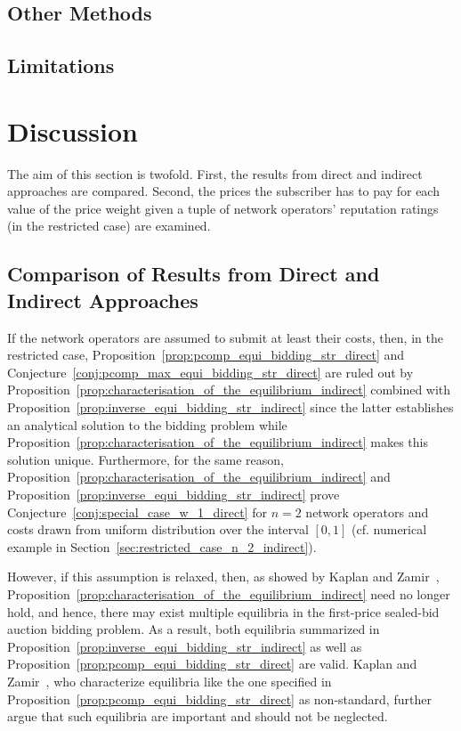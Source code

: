 \subsection{Other Methods} %
\label{sub:other_methods_indirect}


\subsection{Limitations} %
\label{sub:limitations_indirect}


\section{Discussion} %
\label{sec:discussion_indirect}
The aim of this section is twofold. First, the results from direct and indirect approaches are compared. Second, the prices the subscriber has to pay for each value of the price weight given a tuple of network operators' reputation ratings (in the restricted case) are examined.

\subsection{Comparison of Results from Direct and Indirect Approaches} %
\label{sub:comparison_of_results_from_direct_and_indirect_approaches_indirect}
If the network operators are assumed to submit at least their costs, then, in the restricted case, Proposition~\ref{prop:pcomp_equi_bidding_str_direct} and Conjecture~\ref{conj:pcomp_max_equi_bidding_str_direct} are ruled out by Proposition~\ref{prop:characterisation_of_the_equilibrium_indirect} combined with Proposition~\ref{prop:inverse_equi_bidding_str_indirect} since the latter establishes an analytical solution to the bidding problem while Proposition~\ref{prop:characterisation_of_the_equilibrium_indirect} makes this solution unique. Furthermore, for the same reason, Proposition~\ref{prop:characterisation_of_the_equilibrium_indirect} and Proposition~\ref{prop:inverse_equi_bidding_str_indirect} prove Conjecture~\ref{conj:special_case_w_1_direct} for $n=2$ network operators and costs drawn from uniform distribution over the interval $[0,1]$ (cf. numerical example in Section~\ref{sec:restricted_case_n_2_indirect}).

However, if this assumption is relaxed, then, as showed by Kaplan and Zamir~\cite{KaplanZamir2011}, Proposition~\ref{prop:characterisation_of_the_equilibrium_indirect} need no longer hold, and hence, there may exist multiple equilibria in the first-price sealed-bid auction bidding problem. As a result, both equilibria summarized in Proposition~\ref{prop:inverse_equi_bidding_str_indirect} as well as Proposition~\ref{prop:pcomp_equi_bidding_str_direct} are valid. Kaplan and Zamir~\cite{KaplanZamir2011}, who characterize equilibria like the one specified in Proposition~\ref{prop:pcomp_equi_bidding_str_direct} as non-standard, further argue that such equilibria are important and should not be neglected.

